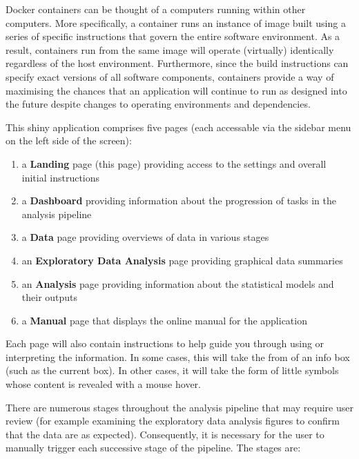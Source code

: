 \documentclass[
  8pt,
  a4paper]{article}
\providecommand{\tightlist}{%
  \setlength{\itemsep}{0pt}\setlength{\parskip}{0pt}}
\begin{document}
Docker containers can be thought of a computers running within other
computers. More specifically, a container runs an instance of image
built using a series of specific instructions that govern the entire
software environment. As a result, containers run from the same image
will operate (virtually) identically regardless of the host environment.
Furthermore, since the build instructions can specify exact versions of
all software components, containers provide a way of maximising the
chances that an application will continue to run as designed into the
future despite changes to operating environments and dependencies.

This shiny application comprises five pages (each accessable via the
sidebar menu on the left side of the screen):

\begin{enumerate}
\def\labelenumi{\arabic{enumi}.}
\tightlist
\item
  a \textbf{Landing} page (this page) providing access to the settings
  and overall initial instructions
\item
  a \textbf{Dashboard} providing information about the progression of
  tasks in the analysis pipeline
\item
  a \textbf{Data} page providing overviews of data in various stages
\item
  an \textbf{Exploratory Data Analysis} page providing graphical data
  summaries
\item
  an \textbf{Analysis} page providing information about the statistical
  models and their outputs
\item
  a \textbf{Manual} page that displays the online manual for the
  application
\end{enumerate}

Each page will also contain instructions to help guide you through using
or interpreting the information. In some cases, this will take the from
of an info box (such as the current box). In other cases, it will take
the form of little {} symbols whose content is revealed with a mouse
hover.

There are numerous stages throughout the analysis pipeline that may
require user review (for example examining the exploratory data analysis
figures to confirm that the data are as expected). Consequently, it is
necessary for the user to manually trigger each successive stage of the
pipeline. The stages are:
\end{document}
